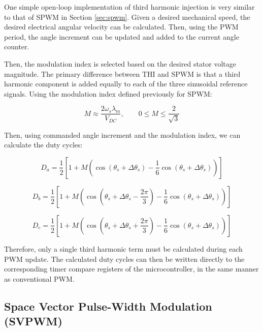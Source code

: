 \documentclass{article}
\begin{document}
One simple open-loop implementation of third harmonic injection is very similar to that of SPWM in Section \ref{sec:spwm}. Given a desired mechanical speed, the desired electrical angular velocity can be calculated. Then, using the PWM period, the angle increment can be updated and added to the current angle counter. 

Then, the modulation index is selected based on the desired stator voltage magnitude. The primary difference between THI and SPWM is that a third harmonic component is added equally to each of the three sinusoidal reference signals. Using the modulation index defined previously for SPWM:

\begin{equation}
    M \approx \frac{2\omega_s\lambda_m}{V_{DC}}, \qquad
    0 \leq M \leq \frac{2}{\sqrt{3}}
\end{equation}

Then, using commanded angle increment and the modulation index, we can calculate the duty cycles:

\begin{equation}
    D_a = \frac{1}{2}\left[1 + M\left(\cos(\theta_s + \Delta\theta_s) - \frac{1}{6}\cos(\theta_s + \Delta\theta_s)\right)\right]
\end{equation}

\begin{equation}
    D_b = \frac{1}{2}\left[1 + M\left(\cos(\theta_s + \Delta\theta_s - \frac{2\pi}{3}) - \frac{1}{6}\cos(\theta_s + \Delta\theta_s)\right)\right]
\end{equation}

\begin{equation}
    D_c = \frac{1}{2}\left[1 + M\left(\cos(\theta_s + \Delta\theta_s + \frac{2\pi}{3}) - \frac{1}{6}\cos(\theta_s + \Delta\theta_s)\right)\right]
\end{equation}

Therefore, only a single third harmonic term must be calculated during each PWM update. The calculated duty cycles can  then be written directly to the corresponding timer compare registers of the microcontroller, in the same manner as conventional PWM.


\subsection{Space Vector Pulse-Width Modulation (SVPWM)}
\label{sec:svpwm}
\end{document}
